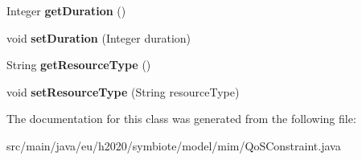 \begin{DoxyCompactItemize}
Integer {\bfseries get\+Duration} ()
\item 
\mbox{\label{classeu_1_1h2020_1_1symbiote_1_1model_1_1mim_1_1QoSConstraint_a401b90159a3a7828d4c3d93993e3e054}} 
void {\bfseries set\+Duration} (Integer duration)
\item 
\mbox{\label{classeu_1_1h2020_1_1symbiote_1_1model_1_1mim_1_1QoSConstraint_a7a98358e8aee7d329a044e967104cb62}} 
String {\bfseries get\+Resource\+Type} ()
\item 
\mbox{\label{classeu_1_1h2020_1_1symbiote_1_1model_1_1mim_1_1QoSConstraint_aad41c2d65eaddde0ebebf5efd35cbb8d}} 
void {\bfseries set\+Resource\+Type} (String resource\+Type)
\end{DoxyCompactItemize}


The documentation for this class was generated from the following file\+:\begin{DoxyCompactItemize}
\item 
src/main/java/eu/h2020/symbiote/model/mim/Qo\+S\+Constraint.\+java\end{DoxyCompactItemize}
